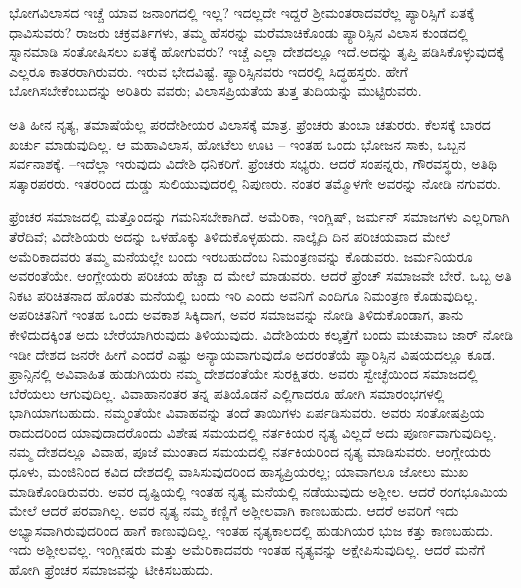 ಭೋಗವಿಲಾಸದ ಇಚ್ಚೆ ಯಾವ ಜನಾಂಗದಲ್ಲಿ ಇಲ್ಲ? ಇದಲ್ಲದೇ ಇದ್ದರೆ ಶ‍್ರೀಮಂತರಾದವರೆಲ್ಲ ಪ್ಯಾರಿಸ್ಸಿಗೆ ಏತಕ್ಕೆ ಧಾವಿಸುವರು? ರಾಜರು ಚಕ್ರವರ್ತಿಗಳು, ತಮ್ಮ ಹೆಸರನ್ನು ಮರೆಮಾಚಿಕೊಂಡು ಪ್ಯಾರಿಸ್ಸಿನ ವಿಲಾಸ ಕುಂಡದಲ್ಲಿ ಸ್ನಾನಮಾಡಿ ಸಂತೋಷಿಸಲು ಏತಕ್ಕೆ ಹೋಗುವರು? ಇಚ್ಚೆ ಎಲ್ಲಾ ದೇಶದಲ್ಲೂ ಇದೆ.ಅದನ್ನು ತೃಪ್ತಿ ಪಡಿಸಿಕೊಳ್ಳುವುದಕ್ಕೆ ಎಲ್ಲರೂ ಕಾತರರಾಗಿರುವರು. ಇರುವ ಭೇದವಿಷ್ಟೆ. ಪ್ಯಾರಿಸ್ಸಿನವರು ಇದರಲ್ಲಿ ಸಿದ್ಧಹಸ್ತರು. ಹೇಗೆ ಬೋಗಿಸಬೇಕೆಂಬುದನ್ನು ಅರಿತಿರು ವವರು; ವಿಲಾಸಪ್ರಿಯತೆಯ ತುತ್ತ ತುದಿಯನ್ನು ಮುಟ್ಟಿರುವರು.

ಅತಿ ಹೀನ ನೃತ್ಯ, ತಮಾಷೆಯೆಲ್ಲ ಪರದೇಶೀಯರ ವಿಲಾಸಕ್ಕೆ ಮಾತ್ರ. ಫ್ರೆಂಚರು ತುಂಬಾ ಚತುರರು. ಕೆಲಸಕ್ಕೆ ಬಾರದ ಖರ್ಚು ಮಾಡುವುದಿಲ್ಲ. ಆ ಮಹಾವಿಲಾಸ, ಹೋಟೆಲು ಊಟ – ಇಂತಹ ಒಂದು ಭೋಜನ ಸಾಕು, ಒಬ್ಬನ ಸರ್ವನಾಶಕ್ಕೆ. –ಇದೆಲ್ಲಾ ಇರುವುದು ವಿದೇಶಿ ಧನಿಕರಿಗೆ. ಫ್ರೆಂಚರು ಸಭ್ಯರು. ಆದರೆ ಸಂಪನ್ನರು, ಗೌರವಸ್ಥರು, ಅತಿಥಿ ಸತ್ಕಾರಪರರು. ಇತರರಿಂದ ದುಡ್ಡು ಸುಲಿಯುವುದರಲ್ಲಿ ನಿಪುಣರು. ನಂತರ ತಮ್ಮೊಳಗೇ ಅವರನ್ನು ನೋಡಿ ನಗುವರು.

ಫ್ರೆಂಚರ ಸಮಾಜದಲ್ಲಿ ಮತ್ತೊಂದನ್ನು ಗಮನಿಸಬೇಕಾಗಿದೆ. ಅಮೆರಿಕಾ, ಇಂಗ್ಲಿಷ್​, ಜರ್ಮನ್​ ಸಮಾಜಗಳು ಎಲ್ಲರಿಗಾಗಿ ತೆರೆದಿವೆ; ವಿದೇಶಿಯರು ಅದನ್ನು ಒಳಹೊಕ್ಕು ತಿಳಿದುಕೊಳ್ಳಹುದು. ನಾಲ್ಕೈದಿ ದಿನ ಪರಿಚಯವಾದ ಮೇಲೆ ಅಮೆರಿಕಾದವರು ತಮ್ಮ ಮನೆಯಲ್ಲೇ ಬಂದು ಇರಬಹುದೆಂಬ ನಿಮಂತ್ರಣವನ್ನು ಕೊಡುವರು. ಜರ್ಮನಿಯರೂ ಅವರಂತೆಯೇ. ಆಂಗ್ಲೇಯರು ಪರಿಚಯ ಹೆಚ್ಚಾ ದ ಮೇಲೆ ಮಾಡುವರು. ಆದರೆ ಫ್ರೆಂಚ್​ ಸಮಾಜವೇ ಬೇರೆ. ಒಬ್ಬ ಅತಿ ನಿಕಟ ಪರಿಚಿತನಾದ ಹೊರತು ಮನೆಯಲ್ಲಿ ಬಂದು ಇರಿ ಎಂದು ಅವನಿಗೆ ಎಂದಿಗೂ ನಿಮಂತ್ರಣ ಕೊಡುವುದಿಲ್ಲ. ಅಪರಿಚಿತನಿಗೆ ಇಂತಹ ಒಂದು ಅವಕಾಶ ಸಿಕ್ಕಿದಾಗ, ಅವರ ಸಮಾಜವನ್ನು ನೋಡಿ ತಿಳಿದುಕೊಂಡಾಗ, ತಾನು ಕೇಳಿದುದಕ್ಕಿಂತ ಅದು ಬೇರೆಯಾಗಿರುವುದು ತಿಳಿಯುವುದು. ವಿದೇಶಿಯರು ಕಲ್ಕತ್ತೆಗೆ ಬಂದು ಮಚುವಾಬ ಜಾರ್​ ನೋಡಿ ಇಡೀ ದೇಶದ ಜನರೇ ಹೀಗೆ ಎಂದರೆ ಎಷ್ಟು ಅನ್ಯಾಯವಾಗುವುದೊ ಅದರಂತೆಯೆ ಪ್ಯಾರಿಸ್ಸಿನ ವಿಷಯದಲ್ಲೂ ಕೂಡ. ಫ್ರಾನ್ಸಿನಲ್ಲಿ ಅವಿವಾಹಿತ ಹುಡುಗಿಯರು ನಮ್ಮ ದೇಶದಂತೆಯೇ ಸುರಕ್ಷಿತರು. ಅವರು ಸ್ವೇಚ್ಛೆಯಿಂದ ಸಮಾಜದಲ್ಲಿ ಬೆರೆಯಲು ಆಗುವುದಿಲ್ಲ. ವಿವಾಹಾನಂತರ ತನ್ನ ಪತಿಯೊಡನೆ ಎಲ್ಲಿಗಾದರೂ ಹೋಗಿ ಸಮಾರಂಭಗಳಲ್ಲಿ ಭಾಗಿಯಾಗಬಹುದು. ನಮ್ಮಂತೆಯೇ ವಿವಾಹವನ್ನು ತಂದೆ ತಾಯಿಗಳು ಏರ್ಪಡಿಸುವರು. ಅವರು ಸಂತೋಷಪ್ರಿಯ ರಾದುದರಿಂದ ಯಾವುದಾದರೊಂದು ವಿಶೇಷ ಸಮಯದಲ್ಲಿ ನರ್ತಕಿಯರ ನೃತ್ಯ ವಿಲ್ಲದೆ ಅದು ಪೂರ್ಣವಾಗುವುದಿಲ್ಲ. ನಮ್ಮ ದೇಶದಲ್ಲೂ ವಿವಾಹ, ಪೂಜೆ ಮುಂತಾದ ಸಮಯದಲ್ಲಿ ನರ್ತಕಿಯರಿಂದ ನೃತ್ಯ ಮಾಡಿಸುವರು. ಆಂಗ್ಲೇಯರು ಧೂಳು, ಮಂಜಿನಿಂದ ಕವಿದ ದೇಶದಲ್ಲಿ ವಾಸಿಸುವುದರಿಂದ ಹಾಸ್ಯಪ್ರಿಯರಲ್ಲ; ಯಾವಾಗಲೂ ಜೋಲು ಮುಖ ಮಾಡಿಕೊಂಡಿರುವರು. ಅವರ ದೃಷ್ಟಿಯಲ್ಲಿ ಇಂತಹ ನೃತ್ಯ ಮನೆಯಲ್ಲಿ ನಡೆಯುವುದು ಅಶ್ಲೀಲ. ಆದರೆ ರಂಗಭೂಮಿಯ ಮೇಲೆ ಆದರೆ ಪರವಾಗಿಲ್ಲ. ಅವರ ನೃತ್ಯ ನಮ್ಮ ಕಣ್ಣಿಗೆ ಅಶ್ಲೀಲವಾಗಿ ಕಾಣಬಹುದು. ಆದರೆ ಅವರಿಗೆ ಇದು ಅಭ್ಯಾಸವಾಗಿರುವುದರಿಂದ ಹಾಗೆ ಕಾಣುವುದಿಲ್ಲ. ಇಂತಹ ನೃತ್ಯಕಾಲದಲ್ಲಿ ಹುಡುಗಿಯರ ಭುಜ ಕತ್ತು ಕಾಣಬಹುದು. ಇದು ಅಶ್ಲೀಲವಲ್ಲ. ಇಂಗ್ಲೀಷರು ಮತ್ತು ಅಮೆರಿಕಾದವರು ಇಂತಹ ನೃತ್ಯವನ್ನು ಅಕ್ಷೇಪಿಸುವುದಿಲ್ಲ. ಆದರೆ ಮನೆಗೆ ಹೋಗಿ ಫ್ರೆಂಚರ ಸಮಾಜವನ್ನು ಟೀಕಿಸಬಹುದು.

